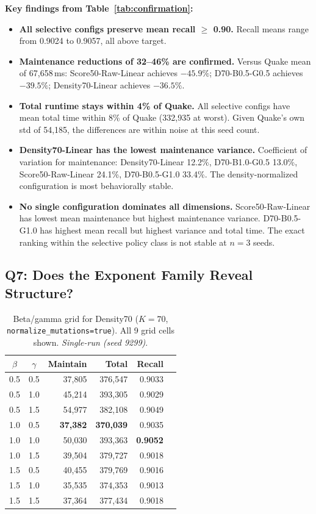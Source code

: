 \documentclass[sigconf, nonacm]{acmart}
\begin{document}
\textbf{Key findings from Table~\ref{tab:confirmation}:}
\begin{itemize}[leftmargin=*]
  \item \textbf{All selective configs preserve mean recall $\geq$ 0.90.}
    Recall means range from 0.9024 to 0.9057, all above target.
  \item \textbf{Maintenance reductions of 32--46\% are confirmed.}
    Versus Quake mean of 67,658\,ms: Score50-Raw-Linear achieves
    $-45.9\%$; D70-B0.5-G0.5 achieves $-39.5\%$; Density70-Linear
    achieves $-36.5\%$.
  \item \textbf{Total runtime stays within 4\% of Quake.}
    All selective configs have mean total time within 8\% of Quake
    (332,935 at worst). Given Quake's own std of 54,185, the
    differences are within noise at this seed count.
  \item \textbf{Density70-Linear has the lowest maintenance variance.}
    Coefficient of variation for maintenance: Density70-Linear 12.2\%,
    D70-B1.0-G0.5 13.0\%, Score50-Raw-Linear 24.1\%,
    D70-B0.5-G1.0 33.4\%. The density-normalized configuration is
    most behaviorally stable.
  \item \textbf{No single configuration dominates all dimensions.}
    Score50-Raw-Linear has lowest mean maintenance but highest
    maintenance variance. D70-B0.5-G1.0 has highest mean recall but
    highest variance and total time. The exact ranking within the
    selective policy class is not stable at $n=3$ seeds.
\end{itemize}

\subsection{Q7: Does the Exponent Family Reveal Structure?}
\label{sec:eval_q7}

\begin{table}[h]
\centering
\caption{Beta/gamma grid for Density70 ($K=70$,
  \texttt{normalize\_mutations=true}).
  All 9 grid cells shown. \textit{Single-run (seed 9299)}.}
\label{tab:grid}
\begin{tabular}{ccrrrr}
  \toprule
  $\beta$ & $\gamma$ & Maintain & Total & Recall \\
  \midrule
  0.5 & 0.5 & 37,805 & 376,547 & 0.9033 \\
  0.5 & 1.0 & 45,214 & 393,305 & 0.9029 \\
  0.5 & 1.5 & 54,977 & 382,108 & 0.9049 \\
  1.0 & 0.5 & \textbf{37,382} & \textbf{370,039} & 0.9035 \\
  1.0 & 1.0 & 50,030 & 393,363 & \textbf{0.9052} \\
  1.0 & 1.5 & 39,504 & 379,727 & 0.9018 \\
  1.5 & 0.5 & 40,455 & 379,769 & 0.9016 \\
  1.5 & 1.0 & 35,535 & 374,353 & 0.9013 \\
  1.5 & 1.5 & 37,364 & 377,434 & 0.9018 \\
  \bottomrule
\end{tabular}
\end{table}
\end{document}
